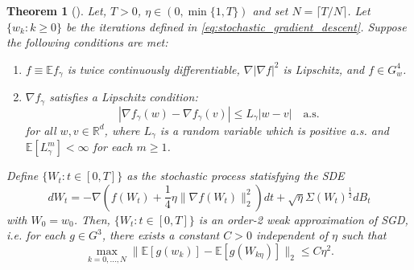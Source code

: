 \documentclass[12pt]{article}
\newtheorem{theorem}{Theorem}[section]
\theoremstyle{definition}
\numberwithin{equation}{section}
\newcommand{\R}{\mathbb{R}}
\newcommand{\E}{\mathbb{E}}
\newcommand{\ev}[1]{\mathbb{E}\left[{#1}\right]}
\newcommand{\norm}[1]{\lVert{#1}\rVert_2}
\begin{document}
\begin{theorem}[\autocite{liStochasticModifiedEquations2019}]
  \label{thm:second_order}
  Let, $T > 0$, $\eta \in (0, \min\{1,T\})$ and set $N = \lceil T/N \rceil$. Let $\{w_k:k\geq 0\}$ be the iterations defined in \eqref{eq:stochastic_gradient_descent}. Suppose the following conditions are met:
  \begin{enumerate}[label=(\roman*)]
    \item $f \equiv \E f_{\gamma}$ is twice continuously differentiable, $\nabla |\nabla f |^2$ is Lipschitz, and $f \in G^4_w$.
    \item $\nabla f_{\gamma}$ satisfies a Lipschitz condition:
    \begin{equation*}
      |\nabla f_{\gamma}(w) - \nabla f_{\gamma}(v)| \leq L_{\gamma} |w - v| \quad \text{a.s.}
    \end{equation*}
    for all $w,v \in \R^d$, where $L_{\gamma}$ is a random variable which is positive a.s. and $\ev{L_{\gamma}^m} < \infty$ for each $m \geq 1$.
  \end{enumerate}
  Define $\{W_t:t\in [0,T] \}$ as the stochastic process statisfying the SDE
  \begin{equation}
    \label{eq:second_order_sde}
    d W_t = -\nabla\left(f(W_t) + \frac{1}{4}\eta \norm{\nabla f(W_t)}^2\right)dt + \sqrt{\eta}\Sigma(W_t)^{\frac{1}{2}}dB_t
  \end{equation}
  with $W_0 = w_0$. Then, $\{W_t:t\in [0,T] \}$ is an order-2 weak approximation of SGD, i.e. for each $g \in G^3$, there exists a constant $C > 0$ independent of $\eta$ such that
  \begin{equation}
    \max_{k=0,\dots,N} \norm{\ev{g(w_k)} - \ev{g(W_{k\eta})}} \leq C \eta^2.
  \end{equation}
\end{theorem}
\end{document}
